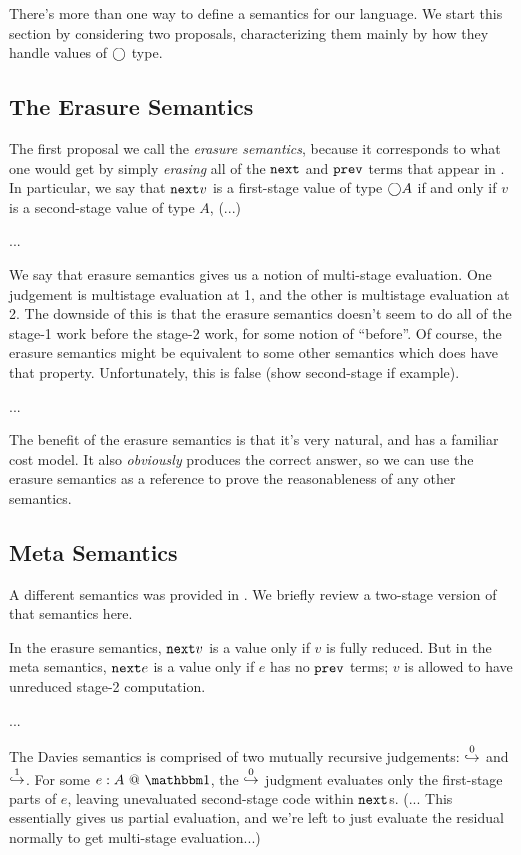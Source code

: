 There's more than one way to define a semantics for our language.  We start this section by considering two proposals, characterizing them mainly by how they handle values of $\bigcirc$ type.

\subsection{The Erasure Semantics}

The first proposal we call the {\em erasure semantics}, because it corresponds to what one would get by simply {\em erasing} all of the ${\tt next}$ and ${\tt prev}$ terms that appear in \lamStaged.  In particular, we say that ${\tt next} v$ is a first-stage value of type $\bigcirc A$ if and only if $v$ is a second-stage value of type $A$, (...)

...

We say that erasure semantics gives us a notion of multi-stage evaluation.  One judgement is multistage evaluation at 1, and the other is multistage evaluation at 2.  The downside of this is that the erasure semantics doesn't seem to do all of the stage-1 work before the stage-2 work, for some notion of ``before''.  Of course, the erasure semantics might be equivalent to some other semantics which does have that property.  Unfortunately, this is false (show second-stage if example).

...

The benefit of the erasure semantics is that it's very natural, and has a familiar cost model.  It also {\em obviously} produces the correct answer, so we can use the erasure semantics as a reference to prove the reasonableness of any other semantics.

\subsection{Meta Semantics}

A different semantics was provided in \cite{davies96}.  We briefly review a two-stage version of that semantics here.

In the erasure semantics, ${\tt next} v$ is a value only if $v$ is fully reduced.  But in the meta semantics, ${\tt next} e$ is a value only if $e$ has no ${\tt prev}$ terms; $v$ is allowed to have unreduced stage-2 computation. 

...

The Davies semantics is comprised of two mutually recursive judgements: $\overset 0 \hookrightarrow$ and $\overset 1 \hookrightarrow$.  For some $\colone e A$, the $\overset 0 \hookrightarrow$ judgment evaluates only the first-stage parts of $e$, leaving unevaluated second-stage code within ${\tt next}$s.  (... This essentially gives us partial evaluation, and we're left to just evaluate the residual normally to get multi-stage evaluation...) 

